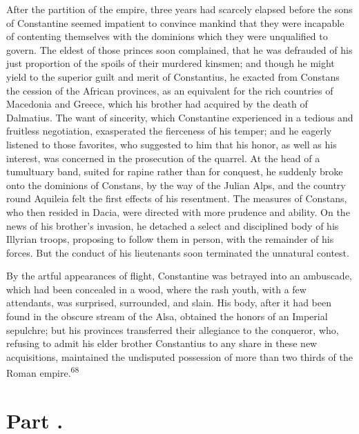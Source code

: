 After the partition of the empire, three years had scarcely
elapsed before the sons of Constantine seemed impatient to
convince mankind that they were incapable of contenting
themselves with the dominions which they were unqualified to
govern. The eldest of those princes soon complained, that he was
defrauded of his just proportion of the spoils of their murdered
kinsmen; and though he might yield to the superior guilt and
merit of Constantius, he exacted from Constans the cession of the
African provinces, as an equivalent for the rich countries of
Macedonia and Greece, which his brother had acquired by the death
of Dalmatius. The want of sincerity, which Constantine
experienced in a tedious and fruitless negotiation, exasperated
the fierceness of his temper; and he eagerly listened to those
favorites, who suggested to him that his honor, as well as his
interest, was concerned in the prosecution of the quarrel. At the
head of a tumultuary band, suited for rapine rather than for
conquest, he suddenly broke onto the dominions of Constans, by
the way of the Julian Alps, and the country round Aquileia felt
the first effects of his resentment. The measures of Constans,
who then resided in Dacia, were directed with more prudence and
ability. On the news of his brother’s invasion, he detached a
select and disciplined body of his Illyrian troops, proposing to
follow them in person, with the remainder of his forces. But the
conduct of his lieutenants soon terminated the unnatural contest.

By the artful appearances of flight, Constantine was betrayed
into an ambuscade, which had been concealed in a wood, where the
rash youth, with a few attendants, was surprised, surrounded, and
slain. His body, after it had been found in the obscure stream of
the Alsa, obtained the honors of an Imperial sepulchre; but his
provinces transferred their allegiance to the conqueror, who,
refusing to admit his elder brother Constantius to any share in
these new acquisitions, maintained the undisputed possession of
more than two thirds of the Roman empire.\textsuperscript{68}


\section{Part \thesection.}

